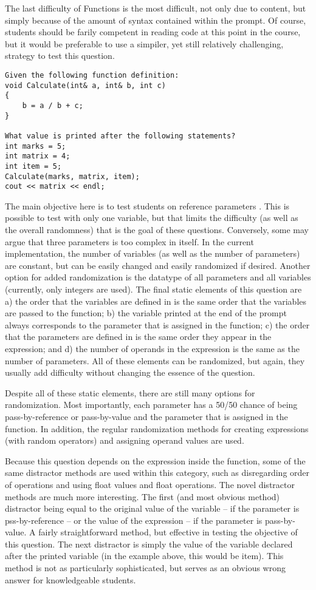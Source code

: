 \documentclass{article}
\begin{document}
The last difficulty of Functions is the most difficult, not only due to content, but simply because of the amount of syntax contained within the prompt. Of course, students should be farily competent in reading code at this point in the course, but it would be preferable to use a simpiler, yet still relatively challenging, strategy to test this question.

\begin{lstlisting}
Given the following function definition:
void Calculate(int& a, int& b, int c)
{
	b = a / b + c;
}

What value is printed after the following statements?
int marks = 5;
int matrix = 4;
int item = 5;
Calculate(marks, matrix, item);
cout << matrix << endl;
\end{lstlisting}

The main objective here is to test students on reference parameters . This is possible to test with only one variable, but that limits the difficulty (as well as the overall randomness) that is the goal of these questions. Conversely, some may argue that three parameters is too complex in itself. In the current implementation, the number of variables (as well as the number of parameters) are constant, but can be easily changed and easily randomized if desired. Another option for added randomization is the datatype of all parameters and all variables (currently, only integers are used). The final static elements of this question are a) the order that the variables are defined in is the same order that the variables are passed to the function; b) the variable printed at the end of the prompt always corresponds to the parameter that is assigned in the function; c) the order that the parameters are defined in is the same order they appear in the expression; and d) the number of operands in the expression is the same as the number of parameters. All of these elements can be randomized, but again, they usually add difficulty without changing the essence of the question. 

Despite all of these static elements, there are still many options for randomization.  Most importantly, each parameter has a 50/50 chance of being pass-by-reference or pass-by-value and the parameter that is assigned in the function. In addition, the regular randomization methods for creating expressions (with random operators) and assigning operand values are used.

Because this question depends on the expression inside the function, some of the same distractor methods are used within this category, such as disregarding order of operations and
using float values and float operations. The novel distractor methods are much more interesting.
The first (and most obvious method) distractor being equal to the original value of the variable -- if the parameter is pss-by-reference -- or the value of the expression -- if the parameter is pass-by-value. A fairly straightforward method, but effective in testing the objective of this question. 
The next distractor is simply the value of the variable declared after the printed variable (in the example above, this would be item). This method is not as particularly sophisticated, but serves as an obvious wrong answer for knowledgeable students. 
\end{document}
